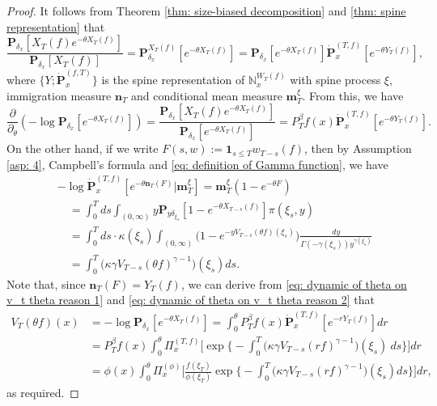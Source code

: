 \documentclass[12pt, a4paper]{amsart}
\theoremstyle{definition}
\numberwithin{equation}{section}
\begin{document}
\begin{proof}
	It follows from Theorem \ref{thm: size-biased decomposition} and \ref{thm: spine representation} that
\[
	\frac{ \mathbf P_{\delta_x}[X_T(f)e^{-\theta X_T(f)}] } {  \mathbf P_{\delta_x} [X_T(f)] }
	= \mathbf P_{\delta_x}^{X_T(f)} [e^{-\theta X_T(f)}]
	= \mathbf P_{\delta_x} [e^{-\theta X_T(f)}] \dot {\mathbf P}_x^{(T,f)}[e^{-\theta Y_T(f)}],
\]
	where $\{Y; \dot {\mathbf P}^{(f,T)}_x\}$ is the spine representation of $\mathbb N^{W_T(f)}_x$ with spine process $\xi$, 
immigration measure
	$\mathbf n_T$ and 
conditional mean measure
	$\mathbf m^\xi_T$.
	From this, we have
\[ \label{eq: dynamic of theta on v_t theta reason 1}
	\frac{\partial}{\partial_\theta}
	(-\log \mathbf P_{\delta_x}[e^{-\theta X_T(f)}])
	= \frac{\mathbf P_{\delta_x}[X_T(f)e^{-\theta X_T(f)}]}{\mathbf P_{\delta_x}[e^{-\theta X_T(f)}]}
	= P^\beta_T f(x) \dot {\mathbf P}_x^{(T,f)}[e^{-\theta Y_T(f)}].
\]
	On the other hand, if we write $F(s,w):= \mathbf 1_{s\leq T} w_{T-s}(f)$, 
	then by Assumption \ref{asp: 4}, Campbell's formula and \eqref{eq: definition of Gamma function}, we have
\[\label{eq: dynamic of theta on v_t theta reason 2}\begin{split}
	&-\log \dot {\mathbf P}^{(T,f)}_{x}[e^{-\theta \mathbf n_T(F)}|\mathbf m_T^\xi]
	= \mathbf m_T^\xi(1-e^{-\theta F})
	\\&\quad = \int_0^T ds \int_{(0,\infty)} y \mathbf P_{y\delta_{\xi_s}}[1- e^{-\theta X_{T-s}(f)}] \pi(\xi_s,y)
	\\&\quad = \int_0^T ds \cdot \kappa(\xi_s) \int_{(0,\infty)} \mathbf (1- e^{- y V_{T-s}(\theta f)(\xi_s)}) \frac{dy}{\Gamma(-\gamma(\xi_s)) y^{\gamma(\xi_s)}}
	\\&\quad = \int_0^T \big(\kappa\gamma V_{T-s}(\theta f)^{\gamma-1}\big)(\xi_s) ds.
\end{split}\]
	Note that, since $\mathbf n_T(F)= Y_T(f)$, we can derive from \eqref{eq: dynamic of theta on v_t theta reason 1} and \eqref{eq: dynamic of theta on v_t theta reason 2} that
\[\begin{split}
	V_T(\theta f)(x)
	&= -\log \mathbf P_{\delta_x}[e^{-\theta X_T(f)}]
	= \int_0^\theta
P^\beta_Tf(x)
	\dot {\mathbf P}_x^{(T,f)}[e^{-r  Y_T(f)}] dr
	\\&=P^\beta_Tf(x)\int_0^\theta \Pi_x^{(T,f)} \Big[\exp\Big\{-\int_0^T \big(\kappa\gamma V_{T-s}(r f)^{\gamma-1}\big)(\xi_s)~ds\Big\}\Big] dr
	\\&= \phi( x) \int_0^\theta \Pi_x^{(\phi)} \Big[ \frac{ f(\xi_T) } { \phi(\xi_T) } \exp\Big\{ - \int_0^T \big( \kappa \gamma V_{T-s} (r f)^{ \gamma - 1} \big) ( \xi_s) ds\Big\} \Big] dr,
\end{split}\]
as required.
\end{proof}
\end{document}

